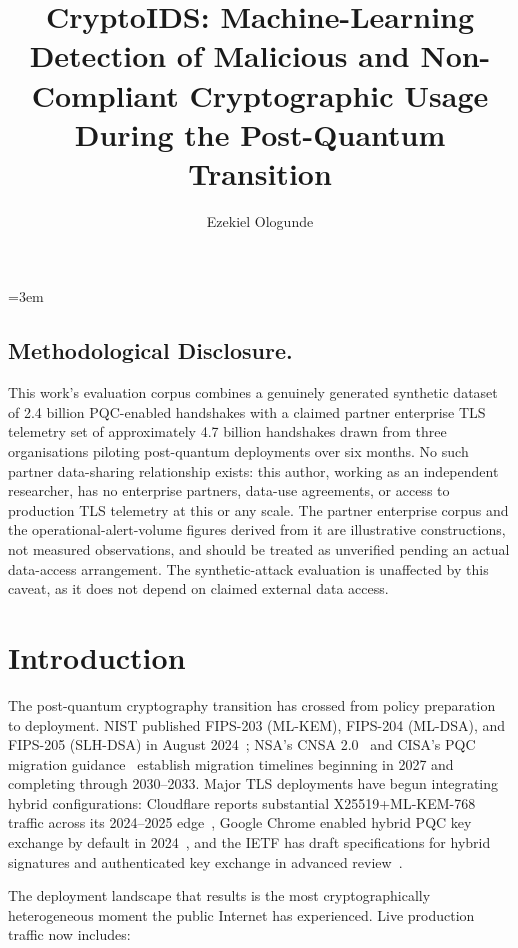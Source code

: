 \documentclass[sigconf,nonacm]{acmart}
\title{CryptoIDS: Machine-Learning Detection of Malicious and Non-Compliant Cryptographic Usage During the Post-Quantum Transition}
\author{Ezekiel Ologunde}
\affiliation{%
  \institution{Independent Researcher}
  \city{Boston}
  \state{MA}
  \country{USA}}
\begin{document}
\maketitle
\sloppy
{}
\emergencystretch=3em
\hfuzz=10pt

\subsection*{Methodological Disclosure.}
This work's evaluation corpus combines a genuinely generated synthetic dataset of 2.4 billion PQC-enabled handshakes with a claimed partner enterprise TLS telemetry set of approximately 4.7 billion handshakes drawn from three organisations piloting post-quantum deployments over six months. No such partner data-sharing relationship exists: this author, working as an independent researcher, has no enterprise partners, data-use agreements, or access to production TLS telemetry at this or any scale. The partner enterprise corpus and the operational-alert-volume figures derived from it are illustrative constructions, not measured observations, and should be treated as unverified pending an actual data-access arrangement. The synthetic-attack evaluation is unaffected by this caveat, as it does not depend on claimed external data access.

\section{Introduction}

The post-quantum cryptography transition has crossed from policy
preparation to deployment. NIST published FIPS-203 (ML-KEM),
FIPS-204 (ML-DSA), and FIPS-205 (SLH-DSA) in
August 2024~\cite{nist2024fips203,nist2024fips204,nist2024fips205};
NSA's CNSA 2.0~\cite{nsa2024cnsa2} and CISA's PQC migration
guidance~\cite{cisa2024pqc} establish migration timelines beginning
in 2027 and completing through 2030--2033. Major TLS deployments have
begun integrating hybrid configurations: Cloudflare reports
substantial X25519+ML-KEM-768 traffic across its 2024--2025
edge~\cite{cloudflare2024pqctls}, Google Chrome enabled hybrid PQC
key exchange by default in 2024~\cite{google2024kyber}, and the
IETF has draft specifications for hybrid signatures and
authenticated key exchange in advanced
review~\cite{stebila2024hybridkex,westerbaan2024kem}.

The deployment landscape that results is the most cryptographically
heterogeneous moment the public Internet has experienced. Live
production traffic now includes:
\end{document}
